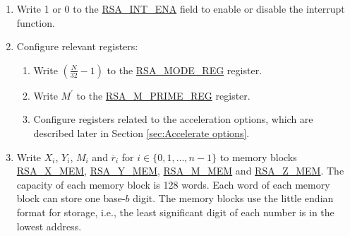\documentclass[main\_\_EN.tex]{subfiles}
\begin{document}
\begin{enumerate}

    \item Write 1 or 0 to the \hyperref[fielddesc:RSAINTENA]{RSA\_INT\_ENA} field to enable or disable the interrupt function.

    \item Configure relevant registers:

    \begin{enumerate}
        \item Write \begin{math}( \frac{N}{32} - 1 )\end{math} to the \hyperref[regdesc:RSAMODEREG]{RSA\_MODE\_REG} register.

        \item Write \begin{math}M^{\prime}\end{math} to the \hyperref[regdesc:RSAMPRIMEREG]{RSA\_M\_PRIME\_REG} register.

        \item Configure registers related to the acceleration options, which are described later in Section \ref{sec:Accelerate options}.

    \end{enumerate}

    \item Write
        \begin{math}X_{i}\end{math},
        \begin{math}Y_{i}\end{math},
        \begin{math}M_{i}\end{math} and
        \begin{math}\overline{r}_{i}\end{math} for \begin{math}i \in \{ 0, 1, \dots, n-1 \} \end{math}
        to memory blocks \hyperref[regdesc:RSAmemory]{RSA\_X\_MEM}, \hyperref[regdesc:RSAmemory]{RSA\_Y\_MEM}, \hyperref[regdesc:RSAmemory]{RSA\_M\_MEM} and \hyperref[regdesc:RSAmemory]{RSA\_Z\_MEM}. The capacity of each memory block is 128 words. Each word of each memory block can store one base-\begin{math}b\end{math} digit. The memory blocks use the little endian format for storage, i.e., the least significant digit of each number is in the lowest address.


\end{enumerate}
\end{document}
